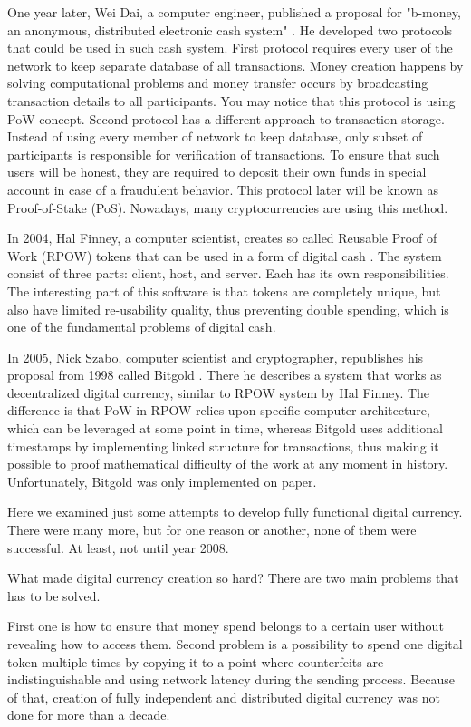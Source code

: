 \documentclass[conference,compsoc]{IEEEtran}
\begin{document}
One year later, Wei Dai, a computer engineer, published a proposal for "b-money, an anonymous, distributed electronic cash system" \cite{bmoney}. He developed two protocols that could be used in such cash system. First protocol requires every user of the network to keep separate database of all transactions. Money creation happens by solving computational problems and money transfer occurs by broadcasting transaction details to all participants. You may notice that this protocol is using PoW concept. Second protocol has a different approach to transaction storage. Instead of using every member of network to keep database, only subset of participants is responsible for verification of transactions. To ensure that such users will be honest, they are required to deposit their own funds in special account in case of a fraudulent behavior. This protocol later will be known as Proof-of-Stake (PoS). Nowadays, many cryptocurrencies are using this method. 

In 2004, Hal Finney, a computer scientist, creates so called Reusable Proof of Work (RPOW) tokens that can be used in a form of digital cash \cite{rpow}. 
The system consist of three parts: client, host, and server. Each has its own responsibilities. 
The interesting part of this software is that tokens are completely unique, but also have limited re-usability quality, thus preventing double spending, which is one of the fundamental problems of digital cash. 

In 2005, Nick Szabo, computer scientist and cryptographer, republishes his proposal from 1998 called Bitgold \cite{bitgold}. 
There he describes a system that works as decentralized digital currency, similar to RPOW system by Hal Finney. 
The difference is that PoW in RPOW relies upon specific computer architecture, which can be leveraged at some point in time, whereas Bitgold uses additional timestamps by implementing linked structure for transactions, thus making it possible to proof mathematical difficulty of the work at any moment in history. 
Unfortunately, Bitgold was only implemented on paper.

Here we examined just some attempts to develop fully functional digital currency. 
There were many more, but for one reason or another, none of them were successful. 
At least, not until year 2008. 

What made digital currency creation so hard? There are two main problems that has to be solved. 

First one is how to ensure that money spend belongs to a certain user without revealing how to access them. 
Second problem is a possibility to spend one digital token multiple times by copying it to a point where counterfeits are indistinguishable and using network latency during the sending process. 
Because of that, creation of fully independent and distributed digital currency was not done for more than a decade. 
\end{document}
